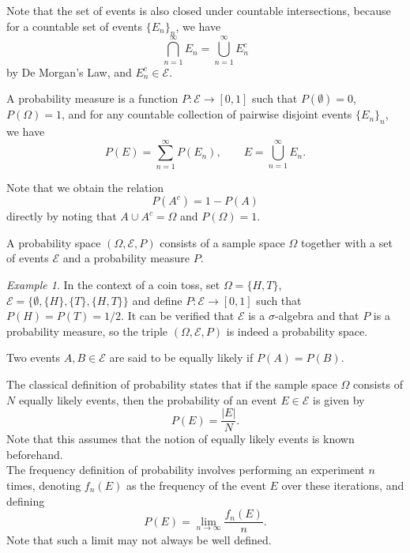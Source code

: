 \documentclass[11pt]{article}
\theoremstyle{definition}
\theoremstyle{remark}
\newtheorem*{example}{Example}
\numberwithin{equation}{module}
\begin{document}
    Note that the set of events is also closed under countable intersections,
    because for a countable set of events $\{E_n\}_n$, we have \[
        \bigcap_{n = 1}^\infty E_n = \bigcup_{n = 1}^\infty E_n^c
    \] by De Morgan's Law, and $E_n^c \in \mathcal{E}$.
    
    \begin{definition}[Probability]
        A probability measure is a function $P\colon \mathcal{E} \to [0, 1]$ such
        that $P(\emptyset) = 0$, $P(\Omega) = 1$, and for any countable collection of
        pairwise disjoint events $\{E_n\}_n$, we have \[
            P(E) = \sum_{n = 1}^\infty P(E_n), \qquad E = \bigcup_{n = 1}^\infty E_n.
        \] 
    \end{definition}

    Note that we obtain the relation \[
        P(A^c) = 1 - P(A)
    \] directly by noting that $A \cup A^c = \Omega$ and $P(\Omega) = 1$.

    \begin{definition}
        A probability space $(\Omega, \mathcal{E}, P)$ consists of a sample space
        $\Omega$ together with a set of events $\mathcal{E}$ and a probability
        measure $P$.
    \end{definition}
    \begin{example}
        In the context of a coin toss, set $\Omega = \{H, T\}$, $\mathcal{E} =
        \{\emptyset, \{H\}, \{T\}, \{H, T\}\}$ and define $P\colon \mathcal{E} \to
        [0, 1]$ such that $P(H) = P(T) = 1 /2$. It can be verified that
        $\mathcal{E}$ is a $\sigma$-algebra and that $P$ is a probability measure,
        so the triple $(\Omega, \mathcal{E}, P)$ is indeed a probability space.
    \end{example}

    \begin{definition}
        Two events $A, B \in \mathcal{E}$ are said to be equally likely if $P(A) =
        P(B)$.
    \end{definition}

    The classical definition of probability states that if the sample space
    $\Omega$ consists of $N$ equally likely events, then the probability of an
    event $E \in \mathcal{E}$ is given by \[
        P(E) = \frac{|E|}{N}.
    \] 
    Note that this assumes that the notion of equally likely events is known
    beforehand.\\

    The frequency definition of probability involves performing an experiment
    $n$ times, denoting $f_n(E)$ as the frequency of the event $E$ over these
    iterations, and defining \[
        P(E) = \lim_{n \to \infty} \frac{f_n(E)}{n}. 
    \] 
    Note that such a limit may not always be well defined.
    
\end{document}
